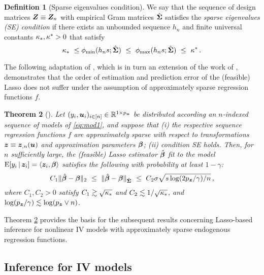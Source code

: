 \documentclass{uwstat572}
\newcommand{\benn}{\begin{equation*}}
\newcommand{\eenn}{\end{equation*}}
\newtheorem{thm}{Theorem}[section]
\theoremstyle{definition}
\newtheorem{defi}[thm]{Definition}
\theoremstyle{remark}
\newcommand{\R}{\ensuremath{\mathbb{R}}}
\newcommand{\Q}{\mathbb{Q}}
\newcommand{\gth}{\theta}
\newcommand{\E}{\mathrm{E}}
\newcommand{\bs}[1]{\boldsymbol{#1}}
\numberwithin{equation}{section}
\begin{document}
\begin{defi}[Sparse eigenvalues condition]
We say that the sequence of design matrices $\Z \equiv \Z_n$ with empirical Gram matrices $\gramhat$ satisfies the \emph{sparse eigenvalues (SE) condition} if there exists an unbounded sequence $h_n$ and finite universal constants $\kappa_*, \kappa^* > 0$ that satisfy
\benn
	\cminse \ \leq \minse(h_n s; \gramhat) \ \leq \ \maxse(h_n s; \gramhat) \ \leq \ \cmaxse \,.
\eenn
\end{defi}

The following adaptation of \cite[Theorem 1]{BC13}, which is in turn an extension of the work of \cite{BRT09}, demonstrates that the order of estimation and prediction error of the (feasible) Lasso does not suffer under the assumption of approximately sparse regression functions $f$.

\begin{thm}[{\cite[Theorem 1]{BCH11}}]\label{thm:1}
Let $(y_i, \u_i)_{i\inn} \in \R^{1\times\pu}$ be distributed according an $n$-indexed sequence of models of \eqref{eq:mod1}, and suppose that (i) the respective sequence regression functions $f$ are approximately sparse with respect to transformations $\z \equiv \z_{,n}(\u)$ and approximation parameters $\regb$; (ii) condition SE holds. Then, for $n$ sufficiently large, the (feasible) Lasso estimator $\regbh$ fit to the model $\E[y_i\,|\,\z_i] = \ip{\z_i,\regb}$ satisfies the following with probability at least $1-\gamma$:
\benn
	C_1\|\regbh - \regb\|_2 \ \leq \ \|\regbh-\regb\|_{\gramhat} \ \leq \ C_2 \sd \sqrt{s\log(2\pz/\gamma)/n} \,,
\eenn
where $C_1, C_2 > 0$ satisfy $C_1 \gtrsim \sqrt{\kappa_*}$ and $C_2 \lesssim 1/\sqrt{\kappa_*}$, and $\log(\pz/\gamma) \lesssim \log(\pz\vee n)$. 
\end{thm}

Theorem \ref{thm:1} provides the basis for the subsequent results concerning Lasso-based inference for nonlinear IV models with approximately sparse endogenous regression functions. 


%
\subsection{Inference for IV models}
\newcommand{\regt}{\gth}
\newcommand{\regg}{\bs{\gamma}}
\newcommand{\rd}{\bs{\delta}}
\newcommand{\rdhat}{\hat{\rd}}
\newcommand{\efi}{v_i}
\newcommand{\efc}{v}
\newcommand{\esc}{u}
\newcommand{\sds}{\sd_\esc}
\newcommand{\sdf}{\sd_\efc}
\renewcommand{\a}{\bs{a}}
\newcommand{\ah}{\hat{\a}}
\newcommand{\sdfs}{\sd_{\esc\efc}}
\newcommand{\xinst}{\x^\dagger}
\newcommand{\xinsti}{x_i^\dagger}
\newcommand{\ainst}{\a^\dagger}
\newcommand{\ainsti}{\a_i^\dagger}
\newcommand{\ainstihat}{\hat{\a}_i^\dagger}
\newcommand{\ainstihatkpt}{\hat{\a}_i^{\dagger\kpt}}
\newcommand{\ainstikpt}{\a_i^{\dagger\kpt}}
\newcommand{\ainstkpt}{\a^{\dagger\kpt}}
\renewcommand{\rm}{\bs{\Delta}}
\newcommand{\g}{\bs{g}}
\renewcommand{\Q}{\bs{Q}}
\newcommand{\Qn}{\Q_n}
\newcommand{\Qnhat}{\hat{\Q}_n}
\newcommand{\Om}{\bs{\Omega}}
\newcommand{\Omn}{\Om_n}
\newcommand{\EEn}{\bar{\E}}
\newcommand{\rdiv}{\rdhat^\dagger}
\newcommand{\sdshat}{\hat{\sds}}
\end{document}
